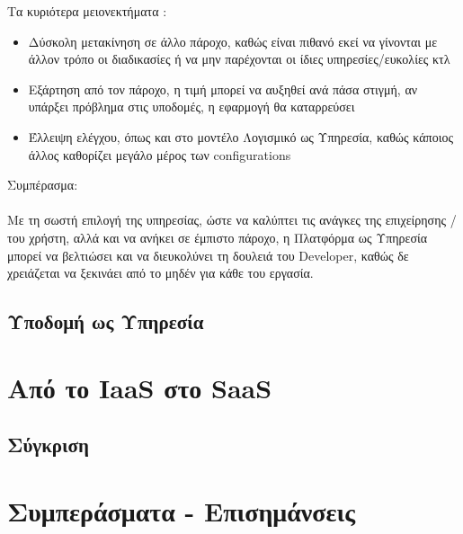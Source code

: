 \documentclass{article}
\begin{document}
Τα κυριότερα μειονεκτήματα :
\begin{itemize}
\item Δύσκολη μετακίνηση σε άλλο πάροχο, καθώς είναι πιθανό εκεί να γίνονται με άλλον τρόπο οι διαδικασίες ή να μην παρέχονται οι ίδιες υπηρεσίες/ευκολίες κτλ
\item Εξάρτηση από τον πάροχο, η τιμή μπορεί να αυξηθεί ανά πάσα στιγμή, αν υπάρξει πρόβλημα στις υποδομές, η εφαρμογή θα καταρρεύσει
\item Έλλειψη ελέγχου, όπως και στο μοντέλο Λογισμικό ως Υπηρεσία, καθώς κάποιος άλλος καθορίζει μεγάλο μέρος των configurations
\end{itemize}
Συμπέρασμα: \\ \\
Με τη σωστή επιλογή της υπηρεσίας, ώστε να καλύπτει τις ανάγκες της επιχείρησης / του χρήστη, αλλά και να ανήκει σε έμπιστο πάροχο, η Πλατφόρμα ως Υπηρεσία μπορεί να βελτιώσει και να διευκολύνει τη δουλειά του Developer, καθώς δε χρειάζεται να ξεκινάει από το μηδέν για κάθε του εργασία.

\subsection{Υποδομή ως Υπηρεσία}
\section{Από το IaaS στο SaaS}

\subsection{Σύγκριση}
\section{Συμπεράσματα - Επισημάνσεις}
\end{document}
